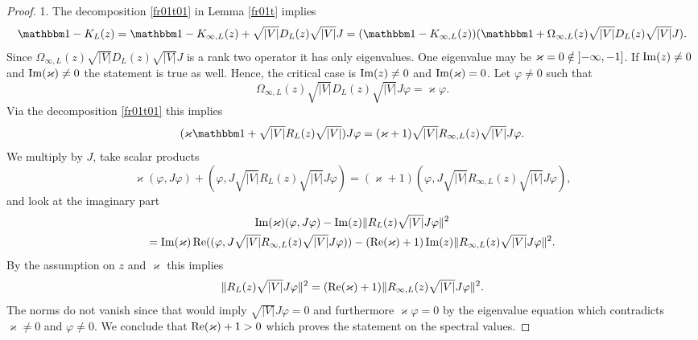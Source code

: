 \begin{proof}
1.
The decomposition \eqref{fr01t01} in Lemma \ref{fr01t} implies
\begin{equation*}
  \id - K_L(z) = \id - K_{\infty,L}(z) + \sqrt{|V|}D_L(z)\sqrt{|V|}J
               = (\id - K_{\infty,L}(z)) (\id + \Omega_{\infty,L}(z)\sqrt{|V|}D_L(z)\sqrt{|V|}J) .
\end{equation*}
Since $\Omega_{\infty,L}(z)\sqrt{|V|}D_L(z)\sqrt{|V|}J$ is a rank two operator it has only eigenvalues. 
One eigenvalue may be $\varkappa=0\notin\interval[open left]{-\infty}{-1}$. If $\operatorname{Im}(z)\neq 0$ and $\operatorname{Im}(\varkappa)\neq 0$
the statement is true as well. Hence, the critical case is $\operatorname{Im}(z)\neq 0$ and $\operatorname{Im}(\varkappa)=0$.
Let $\varphi\neq 0$ such that
\begin{equation*}
  \Omega_{\infty,L}(z)\sqrt{|V|}D_L(z)\sqrt{|V|}J\varphi = \varkappa\varphi .
\end{equation*}
Via the decomposition \eqref{fr01t01} this implies
\begin{equation*}
  ( \varkappa\id + \sqrt{|V|}R_L(z)\sqrt{|V|} )J\varphi = (\varkappa+1)\sqrt{|V|}R_{\infty,L}(z)\sqrt{|V|}J\varphi .
\end{equation*}
We multiply by $J$, take scalar products
\begin{equation*}
  \varkappa (\varphi,J\varphi) + (\varphi,J\sqrt{|V|}R_L(z)\sqrt{|V|}J\varphi)
      = (\varkappa+1)(\varphi,J\sqrt{|V|}R_{\infty,L}(z)\sqrt{|V|}J\varphi) ,
\end{equation*}
and look at the imaginary part
\begin{multline*}
  \operatorname{Im}(\varkappa) (\varphi,J\varphi) - \operatorname{Im}(z) \|R_L(z)\sqrt{|V|}J\varphi\|^2\\
     = \operatorname{Im}(\varkappa)\operatorname{Re}((\varphi,J\sqrt{|V|}R_{\infty,L}(z)\sqrt{|V|}J\varphi)) 
      - (\operatorname{Re}(\varkappa)+1)\operatorname{Im}(z) \|R_{\infty,L}(z)\sqrt{|V|}J\varphi\|^2 .
\end{multline*}
By the assumption on $z$ and $\varkappa$ this implies
\begin{equation*}
  \| R_L(z)\sqrt{|V|}J\varphi\|^2 = (\operatorname{Re}(\varkappa)+1) \|R_{\infty,L}(z)\sqrt{|V|}J\varphi\|^2 .
\end{equation*}
The norms do not vanish since that would imply $\sqrt{|V|}J\varphi=0$ and furthermore $\varkappa\varphi=0$ 
by the eigenvalue equation which contradicts $\varkappa\neq 0$ and $\varphi\neq 0$. We conclude
that $\operatorname{Re}(\varkappa)+1>0$ which proves the statement on the spectral values.


\end{proof}
